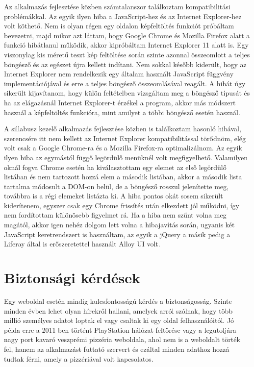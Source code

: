 \documentclass[hidelinks, 12pt, a4paper]{report}
\begin{document}
Az alkalmazás fejlesztése közben számtalanszor találkoztam kompatibilitási problémákkal. Az egyik ilyen hiba a JavaScript-hez és az Internet Explorer-hez volt köthető. Nem is olyan régen egy oldalon képfeltöltés funkciót próbáltam bevezetni, majd mikor azt láttam, hogy Google Chrome és Mozilla Firefox alatt a funkció hibátlanul működik, akkor kipróbáltam Internet Explorer 11 alatt is. Egy viszonylag kis méretű teszt kép feltöltése során szinte azonnal összeomlott a teljes böngésző és az egészet újra kellett indítani. Nem sokkal később kiderült, hogy az Internet Explorer nem rendelkezik egy általam használt JavaScript függvény implementációjával és erre a teljes böngésző összeomlásával reagált. A hibát úgy sikerült kijavítanom, hogy külön feltételben vizsgáltam meg a böngésző típusát és ha az elágazásnál Internet Explorer-t érzékel a program, akkor más módszert használ a képfeltöltés funkcióra, mint amilyet a többi böngésző esetén használ.

A sillabusz kezelő alkalmazás fejlesztése közben is találkoztam hasonló hibával, szerencsére itt nem kellett az Internet Explorer kompatibilitással törődnöm, elég volt csak a Google Chrome-ra és a Mozilla Firefox-ra optimalizálnom. Az egyik ilyen hiba az egymástól függő legördülő menüknél volt megfigyelhető. Valamilyen oknál fogva Chrome esetén ha kiválasztottam egy elemet az első legördülő listában és nem tartozott hozzá elem a második listában, akkor a második lista tartalma módosult a DOM-on belül, de a böngésző rosszul jelenítette meg, továbbra is a régi elemeket listázta ki. A hiba pontos okát sosem sikerült kiderítenem, egyszer csak egy Chrome frissítés után elkezdett jól működni, így nem fordítottam különösebb figyelmet rá. Ha a hiba nem szűnt volna meg magától, akkor igen nehéz dolgom lett volna a hibajavítás során, ugyanis két JavaScript keretrendszert is használtam, az egyik a jQuery \cite{jquery} a másik pedig a Liferay által is erőszeretettel használt Alloy UI \cite{alloyui} volt.

\section{Biztonsági kérdések}

Egy weboldal esetén mindig kulcsfontosságú kérdés a biztonságosság. Szinte minden évben lehet olyan hírekről hallani, amelyek arról szólnak, hogy több millió személyes adatot loptak el vagy csaltak ki egy oldal felhasználóitól. Jó példa erre a 2011-ben történt PlayStation hálózat feltörése vagy a legutoljára nagy port kavaró veszprémi pizzéria weboldala, ahol nem is a weboldalt törték fel, hanem az alkalmazást futtató szervert és ezáltal minden adathoz hozzá tudtak férni, amely a pizzériával volt kapcsolatos.
\end{document}
